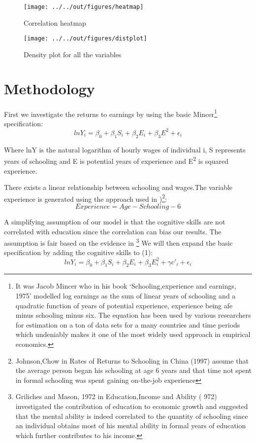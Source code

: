 \documentclass[11pt, a4paper, leqno]{article}
\begin{document}
\begin{figure}
    \caption{Correlation heatmap}
    
    \texttt{[image: ../../out/figures/heatmap]}

\end{figure}

\begin{figure}
    \caption{Density plot for all the variables}
    
    \texttt{[image: ../../out/figures/distplot]}

\end{figure}


\section*{Methodology}

First we investigate the returns to earnings by  using the basic Mincer\footnote{It was Jacob Mincer who in his book ‘Schooling,experience and earnings, 1975’ modelled log earnings as  the sum of linear years of schooling and a quadratic function of years of potential experience, experience being afe minus schooling minus six. The equation has been used by various researchers for estimation on a ton of data sets for a many countries and time periods which undeniably makes it one of the most widely used approach in empirical economics.} specification:
   \[lnY_{i} = \beta_{0} + \beta_{1}S_{i} + \beta_{2}E_{i} + \beta_{3}E^{2}+\epsilon_{i} \label{eq:basic} \tag{1} \]                        

Where lnY is the natural logarithm of hourly wages of individual i, S represents years of schooling and E is potential years of experience and E\textsuperscript{2} is squared experience.\par
There exists a linear relationship between schooling and wages.The variable experience is generated using the approach used in \citet{Chow})\footnote{Johnson,Chow in Rates of Returns to Schooling in China (1997) assume that the average person began his schooling at age  6  years  and  that  time  not  spent  in  formal  schooling  was  spent  gaining  on-the-job experience
}:
                     \[ Experience = Age- Schooling -6\]
                     
 A simplifying assumption of our model is that the cognitive skills are not correlated with education since the correlation can bias our results. The assumption is fair based on the evidence in \citet{Mason}\footnote{Griliches and Mason, 1972 in Education,Income and Ability ( 972) investigated the contribution of education to economic growth and suggested that the mental ability is indeed correlated to the quantity of schooling since an individual obtains most of his mental ability in formal years of education which further contributes to his income.}
 We will then expand the basic specification by adding the cognitive skills to (1):
 \[lnY_{i} = \beta_{0} + \beta_{1}S_{i} + \beta_{2}E_{i} + \beta_{3}E_{i}^{2} + \gamma c'_{i} +\epsilon_{i} \label{eq:cog} \tag{2} \]  
 
\end{document}
